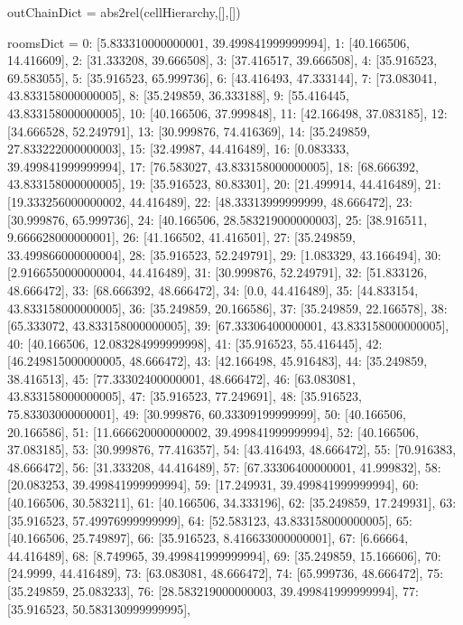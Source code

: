 outChainDict = abs2rel(cellHierarchy,[],[])



roomsDict = {0: [5.833310000000001, 39.499841999999994],
 1: [40.166506, 14.416609],
 2: [31.333208, 39.666508],
 3: [37.416517, 39.666508],
 4: [35.916523, 69.583055],
 5: [35.916523, 65.999736],
 6: [43.416493, 47.333144],
 7: [73.083041, 43.833158000000005],
 8: [35.249859, 36.333188],
 9: [55.416445, 43.833158000000005],
 10: [40.166506, 37.999848],
 11: [42.166498, 37.083185],
 12: [34.666528, 52.249791],
 13: [30.999876, 74.416369],
 14: [35.249859, 27.833222000000003],
 15: [32.49987, 44.416489],
 16: [0.083333, 39.499841999999994],
 17: [76.583027, 43.833158000000005],
 18: [68.666392, 43.833158000000005],
 19: [35.916523, 80.83301],
 20: [21.499914, 44.416489],
 21: [19.333256000000002, 44.416489],
 22: [48.33313999999999, 48.666472],
 23: [30.999876, 65.999736],
 24: [40.166506, 28.583219000000003],
 25: [38.916511, 9.666628000000001],
 26: [41.166502, 41.416501],
 27: [35.249859, 33.499866000000004],
 28: [35.916523, 52.249791],
 29: [1.083329, 43.166494],
 30: [2.9166550000000004, 44.416489],
 31: [30.999876, 52.249791],
 32: [51.833126, 48.666472],
 33: [68.666392, 48.666472],
 34: [0.0, 44.416489],
 35: [44.833154, 43.833158000000005],
 36: [35.249859, 20.166586],
 37: [35.249859, 22.166578],
 38: [65.333072, 43.833158000000005],
 39: [67.33306400000001, 43.833158000000005],
 40: [40.166506, 12.083284999999998],
 41: [35.916523, 55.416445],
 42: [46.249815000000005, 48.666472],
 43: [42.166498, 45.916483],
 44: [35.249859, 38.416513],
 45: [77.33302400000001, 48.666472],
 46: [63.083081, 43.833158000000005],
 47: [35.916523, 77.249691],
 48: [35.916523, 75.83303000000001],
 49: [30.999876, 60.33309199999999],
 50: [40.166506, 20.166586],
 51: [11.666620000000002, 39.499841999999994],
 52: [40.166506, 37.083185],
 53: [30.999876, 77.416357],
 54: [43.416493, 48.666472],
 55: [70.916383, 48.666472],
 56: [31.333208, 44.416489],
 57: [67.33306400000001, 41.999832],
 58: [20.083253, 39.499841999999994],
 59: [17.249931, 39.499841999999994],
 60: [40.166506, 30.583211],
 61: [40.166506, 34.333196],
 62: [35.249859, 17.249931],
 63: [35.916523, 57.49976999999999],
 64: [52.583123, 43.833158000000005],
 65: [40.166506, 25.749897],
 66: [35.916523, 8.416633000000001],
 67: [6.66664, 44.416489],
 68: [8.749965, 39.499841999999994],
 69: [35.249859, 15.166606],
 70: [24.9999, 44.416489],
 73: [63.083081, 48.666472],
 74: [65.999736, 48.666472],
 75: [35.249859, 25.083233],
 76: [28.583219000000003, 39.499841999999994],
 77: [35.916523, 50.583130999999995],
}
